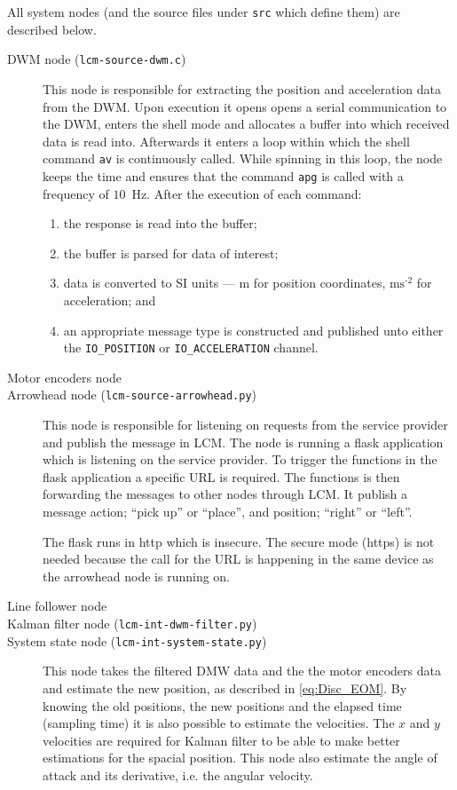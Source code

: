 All system nodes (and the source files under \texttt{src} which define them) are described below.
\begin{description}
\item[DWM node (\texttt{lcm-source-dwm.c})]
This node is responsible for extracting the position and acceleration data from the DWM.
Upon execution it opens opens a serial communication to the DWM, enters the shell mode and allocates a buffer into which received data is read into.
Afterwards it enters a loop within which the shell command \texttt{av} is continuously called.
While spinning in this loop, the node keeps the time and ensures that the command \texttt{apg} is called with a frequency of $10$~Hz.
After the execution of each command:
\begin{enumerate}
  \item the response is read into the buffer;
  \item the buffer is parsed for data of interest;
  \item data is converted to SI units --- m for position coordinates, $\text{ms}^{\text{-2}}$ for acceleration; and
  \item an appropriate message type is constructed and published unto either the \texttt{IO\_POSITION} or \texttt{IO\_ACCELERATION} channel.
\end{enumerate}

\item[Motor encoders node]

\item[Arrowhead node (\texttt{lcm-source-arrowhead.py})]
  This node is responsible for listening on requests from the service provider and publish the message in LCM.
  The node is running a flask application which is listening on the service provider.
  To trigger the functions in the flask application a specific URL is required.
  The functions is then forwarding the messages to other nodes through LCM.
  It publish a message action; ``pick up'' or ``place'', and position; ``right'' or ``left''.

  The flask runs in http which is insecure.
  The secure mode (https) is not needed because the call for the URL is happening in the same device as the arrowhead node is running on.

\item[Line follower node]

\item[Kalman filter node (\texttt{lcm-int-dwm-filter.py})]

\item[System state node (\texttt{lcm-int-system-state.py})]
This node takes the filtered DMW data and the the motor encoders data and estimate the new position, as described in \eqref{eq:Disc_EOM}.
By knowing the old positions, the new positions and the elapsed time (sampling time) it is also possible to estimate the velocities.
The $x$ and $y$ velocities are required for Kalman filter to be able to make better estimations for the spacial position.
This node also estimate the angle of attack and its derivative, i.e. the angular velocity.



\end{description}
